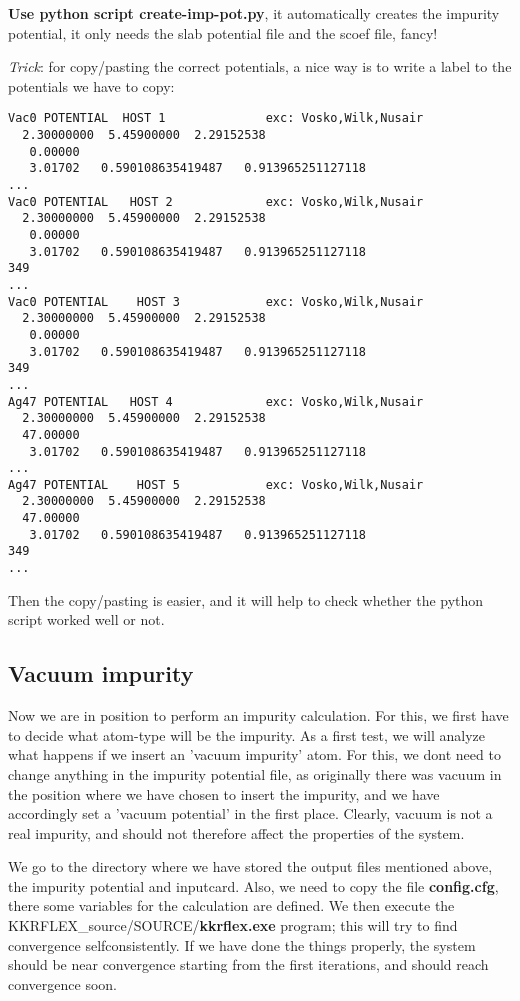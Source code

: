 \documentclass[a4paper,10pt,fullpage]{report}
\begin{document}
\textbf{Use python script create-imp-pot.py}, it automatically creates the impurity potential,
it only needs the slab potential file and the scoef file, fancy!

\textit{Trick}: for copy/pasting the correct potentials, a nice way
is to write a label to the potentials we have to copy:
\begin{verbatim}
Vac0 POTENTIAL  HOST 1              exc: Vosko,Wilk,Nusair
  2.30000000  5.45900000  2.29152538
   0.00000
   3.01702   0.590108635419487   0.913965251127118
...
Vac0 POTENTIAL   HOST 2             exc: Vosko,Wilk,Nusair
  2.30000000  5.45900000  2.29152538
   0.00000
   3.01702   0.590108635419487   0.913965251127118
349
...
Vac0 POTENTIAL    HOST 3            exc: Vosko,Wilk,Nusair
  2.30000000  5.45900000  2.29152538
   0.00000
   3.01702   0.590108635419487   0.913965251127118
349
...
Ag47 POTENTIAL   HOST 4             exc: Vosko,Wilk,Nusair
  2.30000000  5.45900000  2.29152538
  47.00000
   3.01702   0.590108635419487   0.913965251127118
...
Ag47 POTENTIAL    HOST 5            exc: Vosko,Wilk,Nusair
  2.30000000  5.45900000  2.29152538
  47.00000
   3.01702   0.590108635419487   0.913965251127118
349
...
\end{verbatim}
Then the copy/pasting is easier, and it will help to check whether the python
script worked well or not.




\subsection{Vacuum impurity}
\label{sec:vacuum-impurity}

Now we are in position to perform an impurity calculation. For this, we
first have to decide what atom-type will be the impurity. As a first test, we 
will analyze what happens if we insert an 'vacuum impurity' atom.
For this, we dont need to change anything in the impurity potential file,
as originally there was vacuum in the position where we have chosen to insert the
impurity, and we have accordingly set a 'vacuum potential' in the first place. 
Clearly, vacuum is not a real impurity, and should not therefore 
affect the properties of the system.


We go to the directory where we have stored the output files mentioned above,
the impurity potential and inputcard. Also, we need to copy the file
\textbf{config.cfg}, there some variables for the calculation are defined.
We then execute the KKRFLEX\_source/SOURCE/\textbf{kkrflex.exe} program; this will try to find 
convergence selfconsistently. If we have done the things properly, the system
should be near convergence starting from the first iterations, and should reach
convergence soon. 
\end{document}
